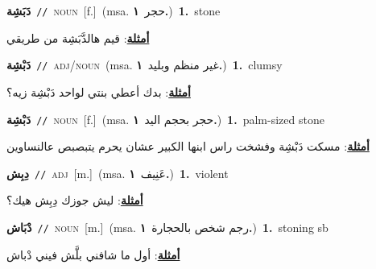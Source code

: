 \documentclass[10pt,a4paper,twoside]{article} %
\begin{document}
\begin{multicols}{2}
{{{{\setlength\topsep{0pt}\textbf{\foreignlanguage{arabic}{دَبَشِة}}\ {\color{gray}\texttt{//}\color{black}}\ \textsc{noun}\ [f.]\ \color{gray}(msa. \foreignlanguage{arabic}{حجر}~\foreignlanguage{arabic}{\textbf{١.}})\color{black}\ \textbf{1.}~stone\  \begin{flushright}\color{gray}\foreignlanguage{arabic}{\textbf{\underline{\foreignlanguage{arabic}{أمثلة}}}: قيم هالدَّبَشِة من طريقي}\end{flushright}\color{black}} \vspace{2mm}

{\setlength\topsep{0pt}\textbf{\foreignlanguage{arabic}{دَبْشِة}}\ {\color{gray}\texttt{//}\color{black}}\ \textsc{adj/noun}\ \color{gray}(msa. \foreignlanguage{arabic}{غير منظم وبليد}~\foreignlanguage{arabic}{\textbf{١.}})\color{black}\ \textbf{1.}~clumsy\  \begin{flushright}\color{gray}\foreignlanguage{arabic}{\textbf{\underline{\foreignlanguage{arabic}{أمثلة}}}: بدك أعطي بنتي لواحد دَبْشِة زيه؟}\end{flushright}\color{black}} \vspace{2mm}

{\setlength\topsep{0pt}\textbf{\foreignlanguage{arabic}{دَبْشِة}}\ {\color{gray}\texttt{//}\color{black}}\ \textsc{noun}\ [f.]\ \color{gray}(msa. \foreignlanguage{arabic}{حجر بحجم اليد}~\foreignlanguage{arabic}{\textbf{١.}})\color{black}\ \textbf{1.}~palm-sized stone\  \begin{flushright}\color{gray}\foreignlanguage{arabic}{\textbf{\underline{\foreignlanguage{arabic}{أمثلة}}}: مسكت دَبْشِة وفشخت راس ابنها الكبير عشان يحرم يتبصبص عالنساوين}\end{flushright}\color{black}} \vspace{2mm}

{\setlength\topsep{0pt}\textbf{\foreignlanguage{arabic}{دِبِش}}\ {\color{gray}\texttt{//}\color{black}}\ \textsc{adj}\ [m.]\ \color{gray}(msa. \foreignlanguage{arabic}{عَنِيف}~\foreignlanguage{arabic}{\textbf{١.}})\color{black}\ \textbf{1.}~violent\  \begin{flushright}\color{gray}\foreignlanguage{arabic}{\textbf{\underline{\foreignlanguage{arabic}{أمثلة}}}: ليش جوزك دِبِش هيك؟}\end{flushright}\color{black}} \vspace{2mm}

{\setlength\topsep{0pt}\textbf{\foreignlanguage{arabic}{دْبَاش}}\ {\color{gray}\texttt{//}\color{black}}\ \textsc{noun}\ [m.]\ \color{gray}(msa. \foreignlanguage{arabic}{رجم شخص بالحجارة}~\foreignlanguage{arabic}{\textbf{١.}})\color{black}\ \textbf{1.}~stoning sb\  \begin{flushright}\color{gray}\foreignlanguage{arabic}{\textbf{\underline{\foreignlanguage{arabic}{أمثلة}}}: أول ما شافني بلَّش فيني دْباش}\end{flushright}\color{black}} \vspace{2mm}

}}}
\end{multicols}
\end{document}
